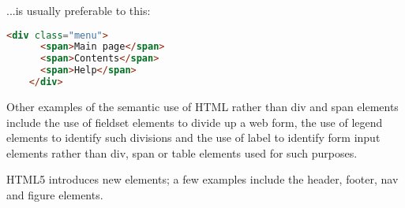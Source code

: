 ...is usually preferable to this:

\begin{lstlisting}[language=HTML]
	<div class="menu">
	  <span>Main page</span>
	  <span>Contents</span>
	  <span>Help</span>
	</div>
\end{lstlisting}


Other examples of the semantic use of HTML rather than div and span elements include the use of fieldset elements to divide up a web form, the use of legend elements to identify such divisions and the use of label to identify form input elements rather than div, span or table elements used for such purposes.

HTML5 introduces new elements; a few examples include the header, footer, nav and figure elements.



































































